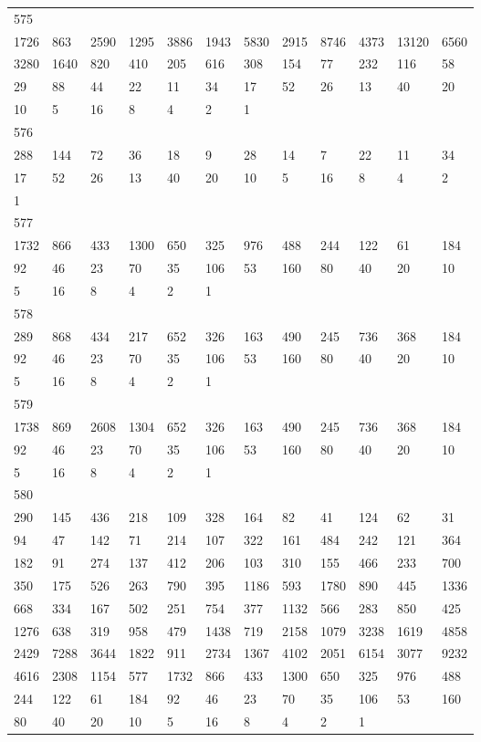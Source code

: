 \begin{longtable}{llllllllllll}
575&&&&&&&&&&&\\
1726& 863& 2590& 1295& 3886& 1943& 5830& 2915& 8746& 4373& 13120& 6560\\
3280& 1640& 820& 410& 205& 616& 308& 154& 77& 232& 116& 58\\
29& 88& 44& 22& 11& 34& 17& 52& 26& 13& 40& 20\\
10& 5& 16& 8& 4& 2& 1& \\

576&&&&&&&&&&&\\
288& 144& 72& 36& 18& 9& 28& 14& 7& 22& 11& 34\\
17& 52& 26& 13& 40& 20& 10& 5& 16& 8& 4& 2\\
1& \\

577&&&&&&&&&&&\\
1732& 866& 433& 1300& 650& 325& 976& 488& 244& 122& 61& 184\\
92& 46& 23& 70& 35& 106& 53& 160& 80& 40& 20& 10\\
5& 16& 8& 4& 2& 1& \\

578&&&&&&&&&&&\\
289& 868& 434& 217& 652& 326& 163& 490& 245& 736& 368& 184\\
92& 46& 23& 70& 35& 106& 53& 160& 80& 40& 20& 10\\
5& 16& 8& 4& 2& 1& \\

579&&&&&&&&&&&\\
1738& 869& 2608& 1304& 652& 326& 163& 490& 245& 736& 368& 184\\
92& 46& 23& 70& 35& 106& 53& 160& 80& 40& 20& 10\\
5& 16& 8& 4& 2& 1& \\

580&&&&&&&&&&&\\
290& 145& 436& 218& 109& 328& 164& 82& 41& 124& 62& 31\\
94& 47& 142& 71& 214& 107& 322& 161& 484& 242& 121& 364\\
182& 91& 274& 137& 412& 206& 103& 310& 155& 466& 233& 700\\
350& 175& 526& 263& 790& 395& 1186& 593& 1780& 890& 445& 1336\\
668& 334& 167& 502& 251& 754& 377& 1132& 566& 283& 850& 425\\
1276& 638& 319& 958& 479& 1438& 719& 2158& 1079& 3238& 1619& 4858\\
2429& 7288& 3644& 1822& 911& 2734& 1367& 4102& 2051& 6154& 3077& 9232\\
4616& 2308& 1154& 577& 1732& 866& 433& 1300& 650& 325& 976& 488\\
244& 122& 61& 184& 92& 46& 23& 70& 35& 106& 53& 160\\
80& 40& 20& 10& 5& 16& 8& 4& 2& 1& \\


\end{longtable}

